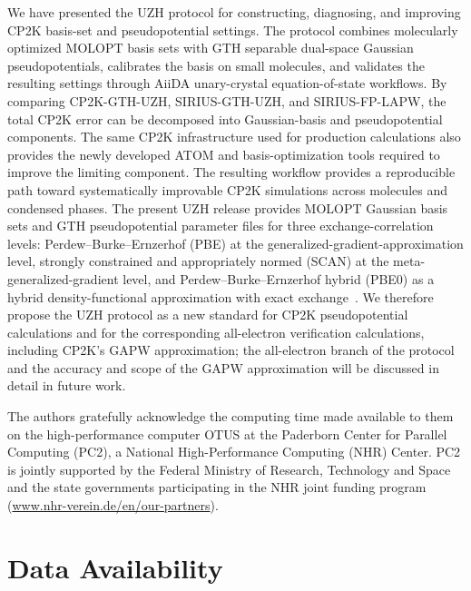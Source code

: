 \documentclass[aps,prb,reprint,amsmath,amssymb,superscriptaddress,longbibliography,floatfix]{revtex4-2}
\begin{document}
We have presented the UZH protocol for constructing, diagnosing, and improving CP2K basis-set and pseudopotential settings. The protocol combines molecularly optimized MOLOPT basis sets with GTH separable dual-space Gaussian pseudopotentials, calibrates the basis on small molecules, and validates the resulting settings through AiiDA unary-crystal equation-of-state workflows. By comparing CP2K-GTH-UZH, SIRIUS-GTH-UZH, and SIRIUS-FP-LAPW, the total CP2K error can be decomposed into Gaussian-basis and pseudopotential components. The same CP2K infrastructure used for production calculations also provides the newly developed ATOM and basis-optimization tools required to improve the limiting component. The resulting workflow provides a reproducible path toward systematically improvable CP2K simulations across molecules and condensed phases. The present UZH release provides MOLOPT Gaussian basis sets and GTH pseudopotential parameter files for three exchange-correlation levels: Perdew--Burke--Ernzerhof (PBE) at the generalized-gradient-approximation level, strongly constrained and appropriately normed (SCAN) at the meta-generalized-gradient level, and Perdew--Burke--Ernzerhof hybrid (PBE0) as a hybrid density-functional approximation with exact exchange~\cite{Perdew1996,Sun2016,Adamo1999}. We therefore propose the UZH protocol as a new standard for CP2K pseudopotential calculations and for the corresponding all-electron verification calculations, including CP2K's GAPW approximation; the all-electron branch of the protocol and the accuracy and scope of the GAPW approximation will be discussed in detail in future work.

\begin{acknowledgments}
The authors gratefully acknowledge the computing time made available to them on the high-performance computer OTUS at the Paderborn Center for Parallel Computing (PC2), a National High-Performance Computing (NHR) Center. PC2 is jointly supported by the Federal Ministry of Research, Technology and Space and the state governments participating in the NHR joint funding program (\url{www.nhr-verein.de/en/our-partners}).
\end{acknowledgments}

\section*{Data Availability}
\end{document}
